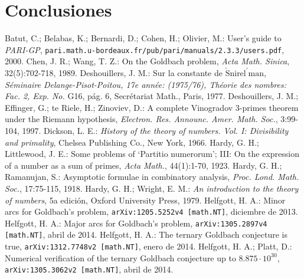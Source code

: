 \documentclass[11pt,a4paper,openright,oneside]{article}
\numberwithin{equation}{section}
\theoremstyle{definition}
\begin{document}
\section{Conclusiones}
\newpage


\begin{thebibliography}{25}
     Batut, C.; Belabas, K.; Bernardi, D.; Cohen, H.; Olivier, M.: User's guide to \textit{PARI-GP},  \newline \texttt{pari.math.u-bordeaux.fr/pub/pari/manuals/2.3.3/users.pdf}, 2000.
     Chen, J. R.; Wang, T. Z.: On the Goldbach problem, \textit{Acta Math. Sinica}, 32(5):702-718, 1989.
     Deshouillers, J. M.: Sur la constante de $\check{\text{S}}\text{nirel}^{\prime} \text{man}$, \textit{S\'eminaire Delange-Pisot-Poitou, 17e ann\'ee: (1975/76), Th\'eorie des nombres: Fac. 2, Exp. No.} G16, p\'ag. 6, Secr\'etariat Math., Paris, 1977.
     Deshouillers, J. M.; Effinger, G.; te Riele, H.; Zinoviev, D.: A complete Vinogradov 3-primes theorem under the Riemann hypothesis, \textit{Electron. Res. Announc. Amer. Math. Soc.}, 3:99-104, 1997.
     Dickson, L. E.: \textit{History of the theory of numbers. Vol. I: Divisibility and primality}, Chelsea Publishing Co., New York, 1966.
     Hardy, G. H.; Littlewood, J. E.: Some problems of \textquoteleft Partitio numerorum\textquoteright; III: On the expression of a number as a sum of primes, \textit{Acta Math.}, 44(1):1-70, 1923.
     Hardy, G. H.; Ramanujan, S.: Asymptotic formulae in combinatory analysis, \textit{Proc. Lond. Math. Soc.}, 17:75-115, 1918.
     Hardy, G. H.; Wright, E. M.: \textit{An introduction to the theory of numbers}, 5a edici\'on, Oxford University Press, 1979.
     Helfgott, H. A.: Minor arcs for Goldbach's problem, \newline \texttt{arXiv:1205.5252v4 [math.NT]}, diciembre de 2013.
     Helfgott, H. A.: Major arcs for Goldbach's problem, \newline \texttt{arXiv:1305.2897v4 [math.NT]}, abril de 2014.
     Helfgott, H. A.: The ternary Goldbach conjecture is true, \newline \texttt{arXiv:1312.7748v2 [math.NT]}, enero de 2014.
     Helfgott, H. A.; Platt, D.: Numerical verification of the ternary Goldbach conjecture up to $8.875 \cdot 10^{30}$, \texttt{arXiv:1305.3062v2 [math.NT]}, abril de 2014.

\end{thebibliography}
\end{document}
